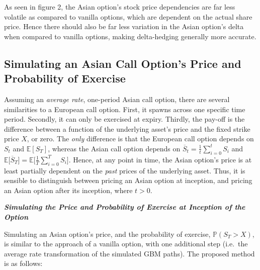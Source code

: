 \documentclass[
  12pt,
]{article}
\begin{document}
As seen in figure 2, the Asian option's stock price dependencies are far
less volatile as compared to vanilla options, which are dependent on the
actual share price. Hence there should also be far less variation in the
Asian option's delta when compared to vanilla options, making
delta-hedging generally more accurate.

\hypertarget{simulating-an-asian-call-options-price-and-probability-of-exercise}{%
\subsection{Simulating an Asian Call Option's Price and Probability of
Exercise}\label{simulating-an-asian-call-options-price-and-probability-of-exercise}}

Assuming an \emph{average rate}, one-period Asian call option, there are
several similarities to a European call option. First, it spawns across
one specific time period. Secondly, it can only be exercised at expiry.
Thirdly, the pay-off is the difference between a function of the
underlying asset's price and the fixed strike price \(X\), or zero. The
\emph{only} difference is that the European call option depends on
\(S_t\) and \(\mathbb E[S_T]\), whereas the Asian call option depends on
\(\overline{S}_t = \frac{1}{t} \sum^{t}_{i = 0} S_i\) and
\(\mathbb E\big[\overline{S}_T\big] = \mathbb E\big[ \frac{1}{T} \sum^{T}_{i = 0} S_i \big]\).
Hence, at any point in time, the Asian option's price is at least
partially dependent on the \emph{past} prices of the underlying asset.
Thus, it is sensible to distinguish between pricing an Asian option at
inception, and pricing an Asian option after its inception, where
\(t>0\).

\vspace{2mm}

\textbf{\emph{Simulating the Price and Probability of Exercise at
Inception of the Option}}

Simulating an Asian option's price, and the probability of exercise,
\(\mathbb P(S_T>X)\), is similar to the approach of a vanilla option,
with one additional step (i.e.~the average rate transformation of the
simulated GBM paths). The proposed method is as follows:
\end{document}
